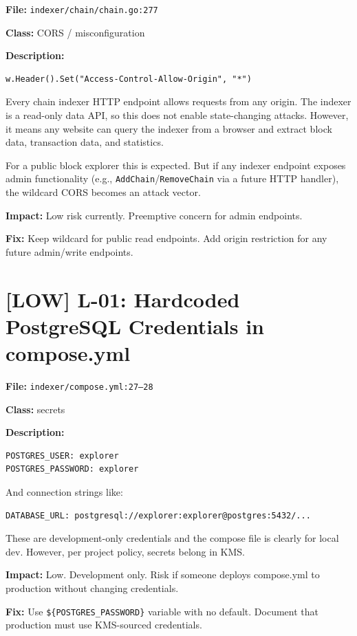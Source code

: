 \documentclass{article}
\begin{document}
\textbf{File:} \texttt{indexer/chain/chain.go:277}

\textbf{Class:} CORS / misconfiguration

\textbf{Description:}
\begin{lstlisting}
w.Header().Set("Access-Control-Allow-Origin", "*")
\end{lstlisting}

Every chain indexer HTTP endpoint allows requests from any origin. The indexer
is a read-only data API, so this does not enable state-changing attacks.
However, it means any website can query the indexer from a browser and
extract block data, transaction data, and statistics.

For a public block explorer this is expected. But if any indexer endpoint
exposes admin functionality (e.g., \texttt{AddChain}/\texttt{RemoveChain}
via a future HTTP handler), the wildcard CORS becomes an attack vector.

\textbf{Impact:} Low risk currently. Preemptive concern for admin endpoints.

\textbf{Fix:} Keep wildcard for public read endpoints. Add origin
restriction for any future admin/write endpoints.


\section{[LOW] L-01: Hardcoded PostgreSQL Credentials in compose.yml}

\textbf{File:} \texttt{indexer/compose.yml:27--28}

\textbf{Class:} secrets

\textbf{Description:}
\begin{lstlisting}
POSTGRES_USER: explorer
POSTGRES_PASSWORD: explorer
\end{lstlisting}

And connection strings like:
\begin{lstlisting}
DATABASE_URL: postgresql://explorer:explorer@postgres:5432/...
\end{lstlisting}

These are development-only credentials and the compose file is clearly for
local dev. However, per project policy, secrets belong in KMS.

\textbf{Impact:} Low. Development only. Risk if someone deploys compose.yml
to production without changing credentials.

\textbf{Fix:} Use \texttt{\$\{POSTGRES\_PASSWORD\}} variable with no default.
Document that production must use KMS-sourced credentials.
\end{document}

